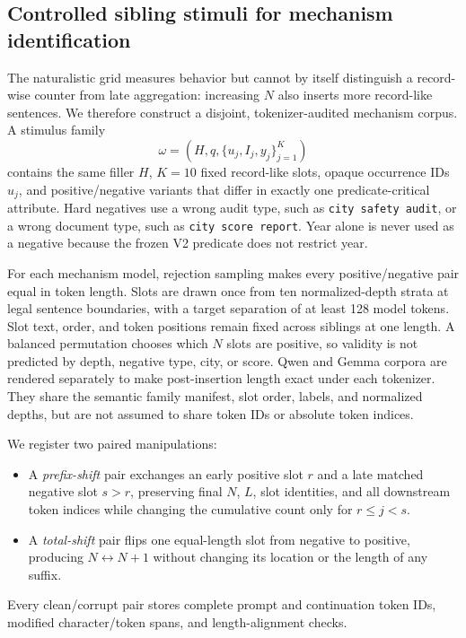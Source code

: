 \subsection{Controlled sibling stimuli for mechanism identification}

The naturalistic grid measures behavior but cannot by itself distinguish a
record-wise counter from late aggregation: increasing \(N\) also inserts more
record-like sentences. We therefore construct a disjoint, tokenizer-audited
mechanism corpus. A stimulus family
\begin{equation}
  \omega=(H,q,\{u_j,I_j,y_j\}_{j=1}^{K})
\label{eq:family}
\end{equation}
contains the same filler \(H\), \(K=10\) fixed record-like slots, opaque
occurrence IDs \(u_j\), and positive/negative variants that differ in exactly
one predicate-critical attribute. Hard negatives use a wrong audit type, such
as \texttt{city safety audit}, or a wrong document type, such as
\texttt{city score report}. Year alone is never used as a negative because
the frozen V2 predicate does not restrict year.

For each mechanism model, rejection sampling makes every positive/negative
pair equal in token length. Slots are drawn once from ten normalized-depth
strata at legal sentence boundaries, with a target separation of at least 128
model tokens. Slot text, order, and token positions remain fixed across
siblings at one length. A balanced permutation chooses which \(N\) slots are
positive, so validity is not predicted by depth, negative type, city, or
score. Qwen and Gemma corpora are rendered separately to make post-insertion
length exact under each tokenizer. They share the semantic family manifest,
slot order, labels, and normalized depths, but are not assumed to share token
IDs or absolute token indices.

We register two paired manipulations:
\begin{itemize}
  \item A \emph{prefix-shift} pair exchanges an early positive slot \(r\) and
  a late matched negative slot \(s>r\), preserving final \(N\), \(L\), slot
  identities, and all downstream token indices while changing the cumulative
  count only for \(r\leq j<s\).
  \item A \emph{total-shift} pair flips one equal-length slot from negative to
  positive, producing \(N\leftrightarrow N+1\) without changing its location
  or the length of any suffix.
\end{itemize}
Every clean/corrupt pair stores complete prompt and continuation token IDs,
modified character/token spans, and length-alignment checks.

